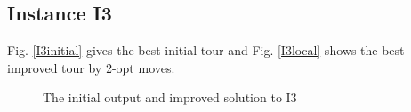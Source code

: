\documentclass[11pt]{article}
\begin{document}
\subsection{Instance I3}
Fig. \ref{I3initial} gives the best initial tour and Fig. \ref{I3local} shows the best improved tour by 2-opt moves.
\begin{figure}[!ht]
\centering
{}
\caption{The initial output and improved solution to I3}
\label{fig:Comparison} %
\end{figure}
\end{document}
